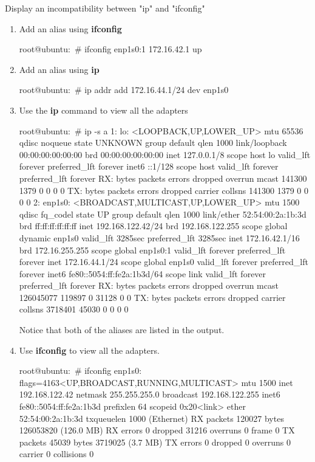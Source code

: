 \begin{Lab}
\begin{exe} {Display an incompatibility between "ip" and "ifconfig"}
\begin{sol}
\begin{enumerate}
			\begin{raw}
root@ubuntu:~# ip -br a
lo               UNKNOWN        127.0.0.1/8 ::1/128
enp1s0           UP             192.168.122.42/24 fe80::5054:ff:fe2a:1b3d/64
			\end{raw}
		\item 
			Add an alias using \textbf{ifconfig} 
			\begin{raw}
root@ubuntu:~# ifconfig enp1s0:1 172.16.42.1 up
			\end{raw} 
		\item   Add an alias using \textbf{ip}
			\begin{raw}
root@ubuntu:~# ip addr add 172.16.44.1/24 dev enp1s0
			\end{raw}
		\item 
			Use the \textbf{ip} command to view all the adapters 
			\begin{raw}
root@ubuntu:~# ip -s a
1: lo: <LOOPBACK,UP,LOWER_UP> mtu 65536 qdisc noqueue state UNKNOWN group default qlen 1000
    link/loopback 00:00:00:00:00:00 brd 00:00:00:00:00:00
    inet 127.0.0.1/8 scope host lo
       valid_lft forever preferred_lft forever
    inet6 ::1/128 scope host 
       valid_lft forever preferred_lft forever
    RX: bytes  packets  errors  dropped overrun mcast   
    141300     1379     0       0       0       0       
    TX: bytes  packets  errors  dropped carrier collsns 
    141300     1379     0       0       0       0       
2: enp1s0: <BROADCAST,MULTICAST,UP,LOWER_UP> mtu 1500 qdisc fq_codel state UP group default qlen 1000
    link/ether 52:54:00:2a:1b:3d brd ff:ff:ff:ff:ff:ff
    inet 192.168.122.42/24 brd 192.168.122.255 scope global dynamic enp1s0
       valid_lft 3285sec preferred_lft 3285sec
    inet 172.16.42.1/16 brd 172.16.255.255 scope global enp1s0:1
       valid_lft forever preferred_lft forever
    inet 172.16.44.1/24 scope global enp1s0
       valid_lft forever preferred_lft forever
    inet6 fe80::5054:ff:fe2a:1b3d/64 scope link 
       valid_lft forever preferred_lft forever
    RX: bytes  packets  errors  dropped overrun mcast   
    126045077  119897   0       31128   0       0       
    TX: bytes  packets  errors  dropped carrier collsns 
    3718401    45030    0       0       0       0       
			\end{raw}
			Notice that both of the aliases 
				are listed in the output. 

		\item Use \textbf{ifconfig} to view all the adapters. 
			\begin{raw}
root@ubuntu:~# ifconfig 
enp1s0: flags=4163<UP,BROADCAST,RUNNING,MULTICAST>  mtu 1500
        inet 192.168.122.42  netmask 255.255.255.0  broadcast 192.168.122.255
        inet6 fe80::5054:ff:fe2a:1b3d  prefixlen 64  scopeid 0x20<link>
        ether 52:54:00:2a:1b:3d  txqueuelen 1000  (Ethernet)
        RX packets 120027  bytes 126053820 (126.0 MB)
        RX errors 0  dropped 31216  overruns 0  frame 0
        TX packets 45039  bytes 3719025 (3.7 MB)
        TX errors 0  dropped 0 overruns 0  carrier 0  collisions 0


\end{raw}
\end{enumerate}
\end{sol}
\end{exe}
\end{Lab}
